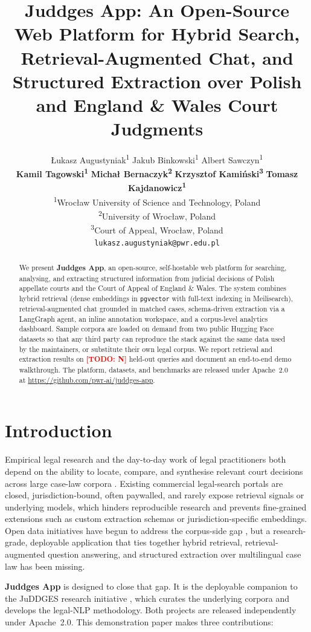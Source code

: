 \documentclass[11pt]{article}
\title{Juddges App: An Open-Source Web Platform for Hybrid Search,
Retrieval-Augmented Chat, and Structured Extraction over
Polish and England \& Wales Court Judgments}
\author{
  \L{}ukasz Augustyniak\textsuperscript{1} \quad
  Jakub Binkowski\textsuperscript{1} \quad
  Albert Sawczyn\textsuperscript{1} \\
  \textbf{Kamil Tagowski\textsuperscript{1}} \quad
  \textbf{Micha\l{} Bernaczyk\textsuperscript{2}} \quad
  \textbf{Krzysztof Kami\'{n}ski\textsuperscript{3}} \quad
  \textbf{Tomasz Kajdanowicz\textsuperscript{1}} \\
  \textsuperscript{1}Wroc\l{}aw University of Science and Technology, Poland \\
  \textsuperscript{2}University of Wroc\l{}aw, Poland \\
  \textsuperscript{3}Court of Appeal, Wroc\l{}aw, Poland \\
  \texttt{lukasz.augustyniak@pwr.edu.pl}
}
\newcommand{\todo}[1]{\textcolor{red}{\textbf{[TODO: #1]}}}
\begin{document}
\maketitle

\begin{abstract}
We present \textbf{Juddges App}, an open-source, self-hostable web
platform for searching, analysing, and extracting structured information
from judicial decisions of Polish appellate courts and the Court of
Appeal of England \& Wales. The system combines hybrid retrieval (dense
embeddings in \texttt{pgvector} with full-text indexing in Meilisearch),
retrieval-augmented chat grounded in matched cases, schema-driven
extraction via a LangGraph agent, an inline annotation workspace, and
a corpus-level analytics dashboard. Sample corpora are loaded on demand
from two public Hugging Face datasets so that any third party can
reproduce the stack against the same data used by the maintainers, or
substitute their own legal corpus. We report retrieval and extraction
results on \todo{N} held-out queries and document an end-to-end demo
walkthrough. The platform, datasets, and benchmarks are released under
Apache~2.0 at \url{https://github.com/pwr-ai/juddges-app}.
\end{abstract}

\section{Introduction}
\label{sec:intro}

Empirical legal research and the day-to-day work of legal practitioners
both depend on the ability to locate, compare, and synthesise relevant
court decisions across large case-law corpora
\citep{katz2023legaltech,chalkidis2020legalbert}. Existing commercial
legal-search portals are closed, jurisdiction-bound, often paywalled,
and rarely expose retrieval signals or underlying models, which hinders
reproducible research and prevents fine-grained extensions such as
custom extraction schemas or jurisdiction-specific embeddings. Open data
initiatives have begun to address the corpus-side gap
\citep{chalkidis2022lexglue,niklaus2023multilegalpile,guha2023legalbench},
but a research-grade, deployable application that ties together hybrid
retrieval, retrieval-augmented question answering, and structured
extraction over multilingual case law has been missing.

\textbf{Juddges App} is designed to close that gap. It is the deployable
companion to the JuDDGES research initiative \citep{juddges-project},
which curates the underlying corpora and develops the legal-NLP
methodology. Both projects are released independently under Apache~2.0.
This demonstration paper makes three contributions:
\end{document}
